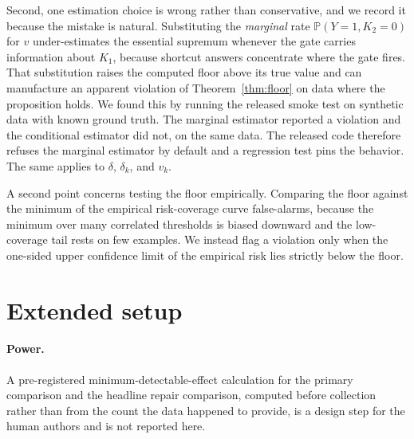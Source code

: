 \documentclass{article}
\begin{document}
Second, one estimation choice is wrong rather than conservative, and we record it because the mistake
is natural. Substituting the \emph{marginal} rate $\mathbb{P}(Y=1,K_2=0)$ for $v$ under-estimates the
essential supremum whenever the gate carries information about $K_1$, because shortcut answers
concentrate where the gate fires. That substitution raises the computed floor above its true value
and can manufacture an apparent violation of Theorem~\ref{thm:floor} on data where the
proposition holds. We found this by running the released smoke test on synthetic data with known
ground truth. The marginal estimator reported a violation and the conditional estimator did not, on
the same data. The released code therefore refuses the marginal estimator by default and a
regression test pins the behavior. The same applies to $\delta$, $\delta_k$, and $v_k$.

A second point concerns testing the floor empirically. Comparing the floor against the minimum of the
empirical risk-coverage curve false-alarms, because the minimum over many correlated thresholds is
biased downward and the low-coverage tail rests on few examples. We instead flag a violation only
when the one-sided upper confidence limit of the empirical risk lies strictly below the floor.

\section{Extended setup}
\label{app:setup}

\paragraph{Power.} A pre-registered minimum-detectable-effect calculation for the primary comparison
and the headline repair comparison, computed before collection rather than from the count the data
happened to provide, is a design step for the human authors and is not reported here.
\end{document}
